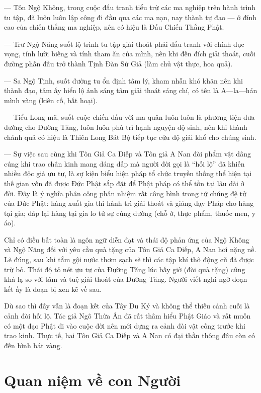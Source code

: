 — Tôn Ngộ Không, trong cuộc đấu tranh tiểu trừ các ma nghiệp trên hành trình tu tập, đã luôn luôn lập công đi đầu qua các ma nạn, nay thành tự đạo — ở đỉnh cao của chiến thắng ma nghiệp, nên có hiệu là Đấu Chiến Thắng Phật.

— Trư Ngộ Năng suốt lộ trình tu tập giải thoát phải đấu tranh với chính dục vọng, tính lười biếng và tính tham ăn của mình, nên khi đến đích giải thoát, cuối đường phấn đầu trở thành Tịnh Đàn Sứ Giả (làm chủ vật thực, hoa quả).

— Sa Ngộ Tịnh, suốt đường tu ổn định tâm lý, kham nhẫn khó khăn nên khi thành đạo, tâm ấy hiển lộ ánh sáng tâm giải thoát sáng chí, có tên là A—la—hán mình vàng (kiên cố, bất hoại).

— Tiểu Long mã, suốt cuộc chiến đấu với ma quân luôn luôn là phương tiện đưa đường cho Đường Tăng, luôn luôn phù trì hạnh nguyện độ sinh, nên khi thành chánh quả có hiệu là Thiên Long Bát Bộ tiếp tục cứu độ giải khổ cho chúng sinh.

— Sự việc sau cùng khi Tôn Giả Ca Diếp và Tôn giả A Nan đòi phẩm vật dâng cúng khi trao chân kinh mang dáng dấp mà người đời gọi là ``hối lộ'' đã khiến nhiều độc giả ưu tư, là sự kiện biểu hiện pháp tổ chức truyền thống thể hiện tại thế gian vốn đã được Đức Phật sắp đặt để Phật pháp có thể tồn tại lâu dài ở đời. Đây là ý nghĩa phân công phân nhiệm rất công bình trong tứ chúng đệ tử của Đức Phật: hàng xuất gia thì hành trì giải thoát và giảng dạy Pháp cho hàng tại gia; đáp lại hàng tại gia lo tứ sự cúng dường (chỗ ở, thực phẩm, thuốc men, y áo).

Chỉ có điều bất toàn là ngôn ngữ diễn đạt và thái độ phản ứng của Ngộ Không và Ngộ Năng đối với yêu cầu quà tặng của Tôn Giả Ca Diếp, A Nan hơi nặng nề. Lẽ đúng, sau khi tắm gội nước thơm sạch sẽ thì các tập khí thô động cũ đã được trừ bỏ. Thái độ tỏ nét ưu tư của Đường Tăng lúc bấy giờ (đòi quà tặng) cũng khá lạ so với tâm và tuệ giải thoát của Đường Tăng. Người viết nghi ngờ đoạn kết ấy là đoạn bị xen kẽ về sau.

Dù sao thì đấy vẫn là đoạn kết của Tây Du Ký và không thể thiếu cảnh cuối là cảnh đòi hối lộ. Tác giả Ngô Thừa Ân đã rất thâm hiểu Phật Giáo và rất muốn có một đạo Phật đi vào cuộc đời nên mới dựng ra cảnh đòi vật cống trước khi trao kinh. Thực tế, hai Tôn Giả Ca Diếp và A Nan có đại thần thông đâu còn có đến bình bát vàng.

\section{Quan niệm về con Người} %
\label{sec:98_99_100_con_nguoi}

